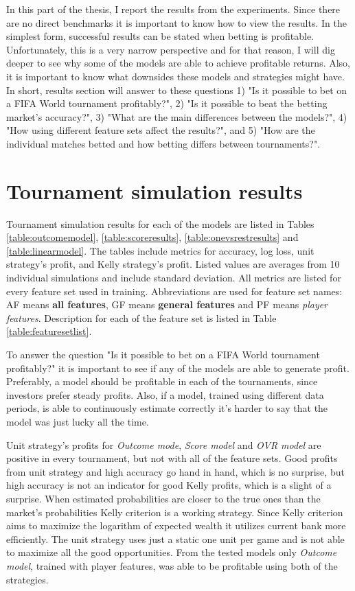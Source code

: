 

In this part of the thesis, I report the results from the experiments. Since there are no direct benchmarks it is important to know how to view the results. In the simplest form, successful results can be stated when betting is profitable. Unfortunately, this is a very narrow perspective and for that reason, I will dig deeper to see why some of the models are able to achieve profitable returns. Also, it is important to know what downsides these models and strategies might have. In short, results section will answer to these questions 1) "Is it possible to bet on a FIFA World tournament profitably?", 2) "Is it possible to beat the betting market's accuracy?", 3) "What are the main differences between the models?", 4) "How using different feature sets affect the results?", and 5) "How are the individual matches betted and how betting differs between tournaments?".

\section{Tournament simulation results}
Tournament simulation results for each of the models are listed in Tables \ref{table:outcomemodel}, \ref{table:scoreresults}, \ref{table:onevsrestresults} and \ref{table:linearmodel}. The tables include metrics for accuracy, log loss, unit strategy's profit, and Kelly strategy's profit. Listed values are averages from 10 individual simulations and include standard deviation. All metrics are listed for every feature set used in training. Abbreviations are used for feature set names: AF means \textbf{all features}, GF means \textbf{general features} and PF means \textit{player features}. Description for each of the feature set is listed in Table \ref{table:featuresetlist}.

To answer the question "Is it possible to bet on a FIFA World tournament profitably?" it is important to see if any of the models are able to generate profit. Preferably, a model should be profitable in each of the tournaments, since investors prefer steady profits. Also, if a model, trained using different data periods, is able to continuously estimate correctly it's harder to say that the model was just lucky all the time.

Unit strategy's profits for \textit{Outcome mode}, \textit{Score model} and \textit{OVR model} are positive in every tournament, but not with all of the feature sets. Good profits from unit strategy and high accuracy go hand in hand, which is no surprise, but high accuracy is not an indicator for good Kelly profits, which is a slight of a surprise. When estimated probabilities are closer to the true ones than the market's probabilities Kelly criterion is a working strategy. Since Kelly criterion aims to maximize the logarithm of expected wealth it utilizes current bank more efficiently. The unit strategy uses just a static one unit per game and is not able to maximize all the good opportunities. From the tested models only \textit{Outcome model}, trained with player features, was able to be profitable using both of the strategies.

